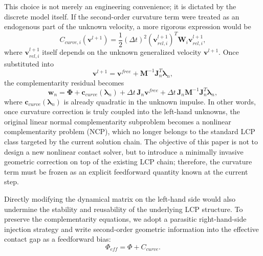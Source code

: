 This choice is not merely an engineering convenience; it is dictated by the discrete model itself. If the second-order curvature term were treated as an endogenous part of the unknown velocity, a more rigorous expression would be
\begin{equation}
    C_{curve,i}(\mathbf{v}^{l+1})
    =
    \frac{1}{2}(\Delta t)^2
    (\mathbf{v}_{rel,i}^{l+1})^T
    \mathbf{W}_i
    \mathbf{v}_{rel,i}^{l+1},
\end{equation}
where $\mathbf{v}_{rel,i}^{l+1}$ itself depends on the unknown generalized velocity $\mathbf{v}^{l+1}$. Once substituted into
\begin{equation}
    \mathbf{v}^{l+1}
    =
    \mathbf{v}^{free}
    +
    \mathbf{M}^{-1}\mathbf{J}_n^T \boldsymbol{\lambda}_n,
\end{equation}
the complementarity residual becomes
\begin{equation}
    \mathbf{w}_n
    =
    \boldsymbol{\Phi}
    +
    \mathbf{c}_{curve}(\boldsymbol{\lambda}_n)
    +
    \Delta t\,\mathbf{J}_n\mathbf{v}^{free}
    +
    \Delta t\,\mathbf{J}_n\mathbf{M}^{-1}\mathbf{J}_n^T\boldsymbol{\lambda}_n,
\end{equation}
where $\mathbf{c}_{curve}(\boldsymbol{\lambda}_n)$ is already quadratic in the unknown impulse. In other words, once curvature correction is truly coupled into the left-hand unknowns, the original linear normal complementarity subproblem becomes a nonlinear complementarity problem (NCP), which no longer belongs to the standard LCP class targeted by the current solution chain. The objective of this paper is not to design a new nonlinear contact solver, but to introduce a minimally invasive geometric correction on top of the existing LCP chain; therefore, the curvature term must be frozen as an explicit feedforward quantity known at the current step.

Directly modifying the dynamical matrix on the left-hand side would also undermine the stability and reusability of the underlying LCP structure. To preserve the complementarity equations, we adopt a parasitic right-hand-side injection strategy and write second-order geometric information into the effective contact gap as a feedforward bias:
\begin{equation}
    \Phi_{eff} = \Phi + C_{curve}.
\end{equation}

